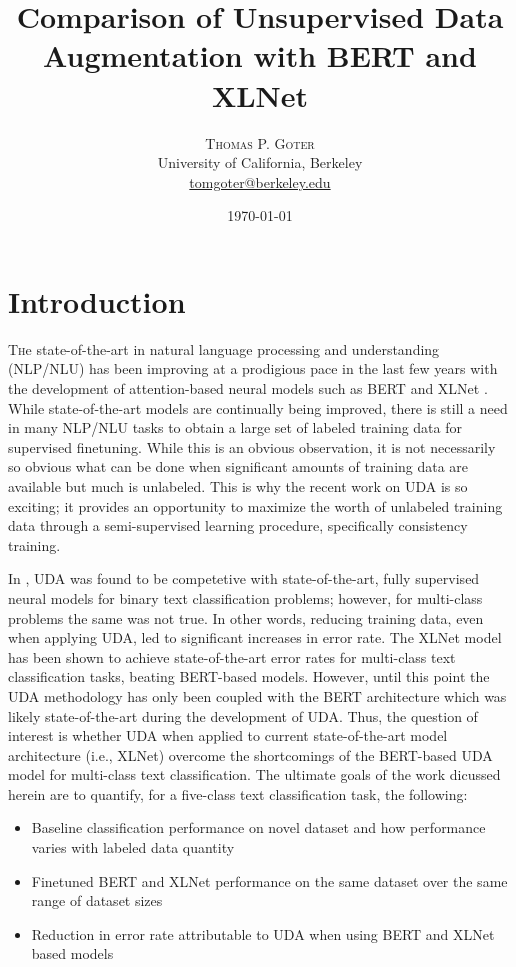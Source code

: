 \documentclass[twoside,twocolumn,10pt]{article}
\title{Comparison of Unsupervised Data Augmentation with BERT and XLNet} %
\author{%
\textsc{Thomas P. Goter} \\[1ex] %
\normalsize University of California, Berkeley \\ %
\normalsize \href{mailto:tomgoter@berkeley.edu}{tomgoter@berkeley.edu} %
}
\date{\today} %
\begin{document}
\maketitle


\section{Introduction} \label{introduction}

\lettrine[nindent=0em,lines=3]{T} he state-of-the-art in natural language processing and understanding (NLP/NLU) has been improving at a prodigious pace in the last few years with the development of attention-based neural models \cite{Vaswani:2017} such as BERT \cite{Devlin:2019} and XLNet \cite{Yang:2019}.  While state-of-the-art models are continually being improved, there is still a need in many NLP/NLU tasks to obtain a large set of labeled training data for supervised finetuning.  While this is an obvious observation, it is not necessarily so obvious what can be done when significant amounts of training data are available but much is unlabeled.  This is why the recent work on UDA \cite{Xie:2019} is so exciting; it provides an opportunity to maximize the worth of unlabeled training data through a semi-supervised learning procedure, specifically consistency training.

In \cite{Xie:2019}, UDA was found to be competetive with state-of-the-art, fully supervised neural models for binary text classification problems; however, for multi-class problems the same was not true.  In other words, reducing training data, even when applying UDA, led to significant increases in error rate. The XLNet model \cite{Xie:2019} has been shown to achieve state-of-the-art error rates for multi-class text classification tasks, beating BERT-based models.  However, until this point the UDA methodology has only been coupled with the BERT architecture which was likely state-of-the-art during the development of UDA. Thus, the question of interest is whether UDA when applied to current state-of-the-art model architecture (i.e., XLNet) 
overcome the shortcomings of the BERT-based UDA model for multi-class text classification. The ultimate goals of the work dicussed herein are to quantify, for a five-class text classification task, the following:
\begin{itemize}
	\item Baseline classification performance on novel dataset and how performance varies with labeled data quantity
	\item Finetuned BERT and XLNet performance on the same dataset over the same range of dataset sizes
	\item Reduction in error rate attributable to UDA when using BERT and XLNet based models
\end{itemize}
\end{document}
